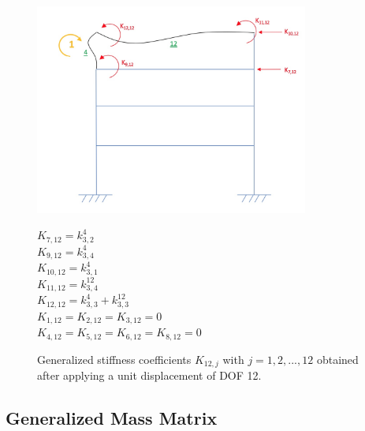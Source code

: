 \documentclass[11pt,a4paper,titlepage]{report}
\begin{document}
\begin{figure} [h]
\begin{minipage}{0.59\linewidth}
        \centering
         \includegraphics[width=9cm]{U=12.jpeg}
\end{minipage}
\begin{minipage}{0.4\linewidth}
\begin{small}
        $K_{7,12} = k^4_{3,2}$\\
        $K_{9,12} = k^4_{3,4}$\\
        $K_{10,12} = k^4_{3,1}$\\
        $K_{11,12} = k^{12}_{3,4}$\\
        $K_{12,12} = k^4_{3,3}+k^{12}_{3,3}$\\
        $K_{1,12} = K_{2,12} = K_{3,12} = 0$\\
        $K_{4,12} = K_{5,12} = K_{6,12} = K_{8,12} =0$\\
\end{small}
\end{minipage}
\caption{Generalized stiffness coefficients $K_{12,j}$ with $j=1,2,...,12$ obtained after applying a unit displacement of DOF 12.}
\label{fig: I.1 - u12=1}
\end{figure}
\subsection{Generalized Mass Matrix}
\end{document}
